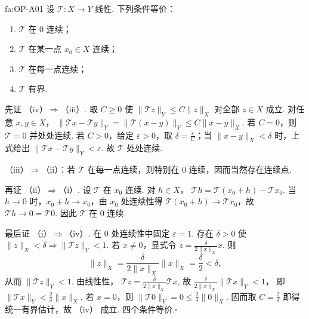 \begin{FATheorem}[A][线性算子连续与有界等价]{fa:OP-A01}
设 \(\displaystyle \mathcal T:X\to Y\) 线性. 下列条件等价：
\begin{enumerate}[label=\textnormal{(\roman*)}]
\item \(\displaystyle \mathcal T\) 在 \(\displaystyle 0\) 连续；
\item \(\displaystyle \mathcal T\) 在某一点 \(\displaystyle x_0\in X\) 连续；
\item \(\displaystyle \mathcal T\) 在每一点连续；
\item \(\displaystyle \mathcal T\) 有界.
\end{enumerate}
\end{FATheorem}

\begin{FAProof}
先证 （iv）\(\displaystyle\Rightarrow\)（iii）. 取 \(\displaystyle C\geqslant0\) 使 \(\displaystyle \|\mathcal T z\|_Y\leqslant C\|z\|_X\) 对全部 \(\displaystyle z\in X\) 成立. 对任意 \(\displaystyle x,y\in X\)， \(\displaystyle \|\mathcal T x-\mathcal T y\|_Y =\|\mathcal T(x-y)\|_Y \leqslant C\|x-y\|_X\).
若 \(\displaystyle C=0\)，则 \(\displaystyle \mathcal T=0\) 并处处连续. 若 \(\displaystyle C>0\)，给定 \(\displaystyle \varepsilon>0\)，取 \(\displaystyle \delta=\frac{\varepsilon}{C}\)；当 \(\displaystyle \|x-y\|_X<\delta\) 时，上式给出 \(\displaystyle \|\mathcal T x-\mathcal T y\|_Y<\varepsilon\). 故 \(\displaystyle \mathcal T\) 处处连续.

（iii）\(\displaystyle\Rightarrow\)（ii）：若 \(\displaystyle \mathcal T\) 在每一点连续，则特别在 \(\displaystyle 0\) 连续，因而当然存在连续点.

再证 （ii）\(\displaystyle\Rightarrow\)（i）. 设 \(\displaystyle \mathcal T\) 在 \(\displaystyle x_0\) 连续. 对 \(\displaystyle h\in X\)， \(\displaystyle \mathcal T h =\mathcal T(x_0+h)-\mathcal T x_0\).
当 \(\displaystyle h\to0\) 时，\(\displaystyle x_0+h\to x_0\)，由 \(\displaystyle x_0\) 处连续性得 \(\displaystyle \mathcal T(x_0+h)\to\mathcal T x_0\)，故 \(\displaystyle \mathcal T h\to0=\mathcal T0\). 因此 \(\displaystyle \mathcal T\) 在 \(\displaystyle0\) 连续.

最后证 （i）\(\displaystyle\Rightarrow\)（iv）. 在 \(\displaystyle0\) 处连续性中固定 \(\displaystyle \varepsilon=1\). 存在 \(\displaystyle \delta>0\) 使 \(\displaystyle \|z\|_X<\delta \Longrightarrow \|\mathcal T z\|_Y<1\).
若 \(\displaystyle x\neq0\)，显式令 \(\displaystyle z=\frac{\delta}{2\|x\|_X}x\).
则
\[
\|z\|_X
=\frac{\delta}{2\|x\|_X}\|x\|_X
=\frac{\delta}{2}
<\delta,
\]
从而 \(\displaystyle \|\mathcal T z\|_Y<1\). 由线性性， \(\displaystyle \mathcal T z =\frac{\delta}{2\|x\|_X}\mathcal T x\),
故 \(\displaystyle \frac{\delta}{2\|x\|_X}\|\mathcal T x\|_Y<1\)，
即 \(\displaystyle \|\mathcal T x\|_Y <\frac{2}{\delta}\|x\|_X\).
若 \(\displaystyle x=0\)，则 \(\displaystyle \|\mathcal T0\|_Y=0\leqslant\frac{2}{\delta}\|0\|_X\). 因而取 \(\displaystyle C=\frac{2}{\delta}\) 即得统一有界估计，故 （iv） 成立. 四个条件等价.\hfill\(\square\)
\end{FAProof}

